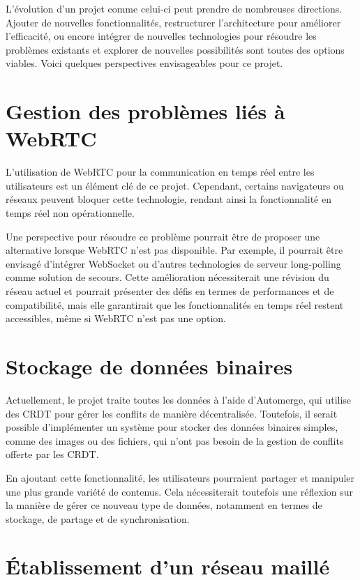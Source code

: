 L'évolution d'un projet comme celui-ci peut prendre de nombreuses directions. Ajouter de nouvelles fonctionnalités, restructurer l'architecture pour améliorer l'efficacité, ou encore intégrer de nouvelles technologies pour résoudre les problèmes existants et explorer de nouvelles possibilités sont toutes des options viables. Voici quelques perspectives envisageables pour ce projet.

\section{Gestion des problèmes liés à WebRTC}

L'utilisation de WebRTC pour la communication en temps réel entre les utilisateurs est un élément clé de ce projet. Cependant, certains navigateurs ou réseaux peuvent bloquer cette technologie, rendant ainsi la fonctionnalité en temps réel non opérationnelle.

Une perspective pour résoudre ce problème pourrait être de proposer une alternative lorsque WebRTC n'est pas disponible. Par exemple, il pourrait être envisagé d'intégrer WebSocket ou d'autres technologies de serveur long-polling comme solution de secours. Cette amélioration nécessiterait une révision du réseau actuel et pourrait présenter des défis en termes de performances et de compatibilité, mais elle garantirait que les fonctionnalités en temps réel restent accessibles, même si WebRTC n'est pas une option.

\section{Stockage de données binaires}

Actuellement, le projet traite toutes les données à l'aide d'Automerge, qui utilise des CRDT pour gérer les conflits de manière décentralisée. Toutefois, il serait possible d'implémenter un système pour stocker des données binaires simples, comme des images ou des fichiers, qui n'ont pas besoin de la gestion de conflits offerte par les CRDT.

En ajoutant cette fonctionnalité, les utilisateurs pourraient partager et manipuler une plus grande variété de contenus. Cela nécessiterait toutefois une réflexion sur la manière de gérer ce nouveau type de données, notamment en termes de stockage, de partage et de synchronisation.

\section{Établissement d'un réseau maillé}

